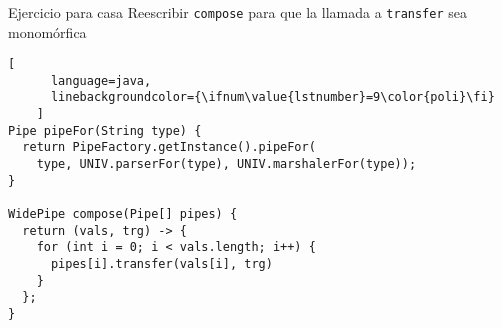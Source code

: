 \begin{frame}[fragile]
  \frametitle{\ft}
  \begin{block}{Ejercicio para casa}
  Reescribir {\tt compose} para que la llamada a {\tt transfer} sea
  monomórfica
    \begin{lstlisting}[
      language=java,
      linebackgroundcolor={\ifnum\value{lstnumber}=9\color{poli}\fi}
    ]
Pipe pipeFor(String type) {
  return PipeFactory.getInstance().pipeFor(
    type, UNIV.parserFor(type), UNIV.marshalerFor(type));
}

WidePipe compose(Pipe[] pipes) {
  return (vals, trg) -> {
    for (int i = 0; i < vals.length; i++) {
      pipes[i].transfer(vals[i], trg)
    }
  };
}
    \end{lstlisting}
  \end{block}
\end{frame}

